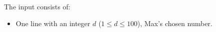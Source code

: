 
  The input consists of:
  \begin{itemize}
    \item One line with an integer $d$ ($1 \le d \le 100$), Max's chosen number.
  \end{itemize}

